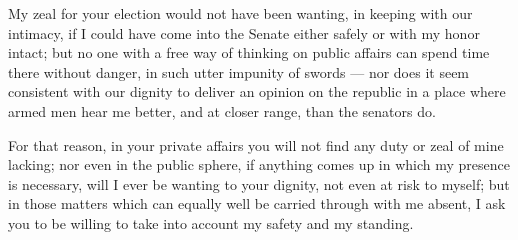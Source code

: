 

 My zeal for your election would not have been wanting, in keeping with our intimacy, if I could have come into the Senate either safely or with my honor intact; but no one with a free way of thinking on public affairs can spend time there without danger, in such utter impunity of swords --- nor does it seem consistent with our dignity to deliver an opinion on the republic in a place where armed men hear me better, and at closer range, than the senators do.

 For that reason, in your private affairs you will not find any duty or zeal of mine lacking; nor even in the public sphere, if anything comes up in which my presence is necessary, will I ever be wanting to your dignity, not even at risk to myself; but in those matters which can equally well be carried through with me absent, I ask you to be willing to take into account my safety and my standing.
